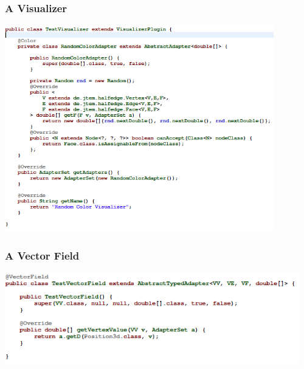 \documentclass[12pt]{beamer}
\begin{document}
\begin{frame}
\frametitle{A Visualizer}
\begin{center}
\includegraphics[height=9cm]{visualizer.png}\\	
\end{center}
\end{frame}

\begin{frame}
\frametitle{A Vector Field}
\begin{center}
\includegraphics[height=4cm]{vectorfield.png}\\	
\end{center}
\end{frame}

% 
\end{document}
